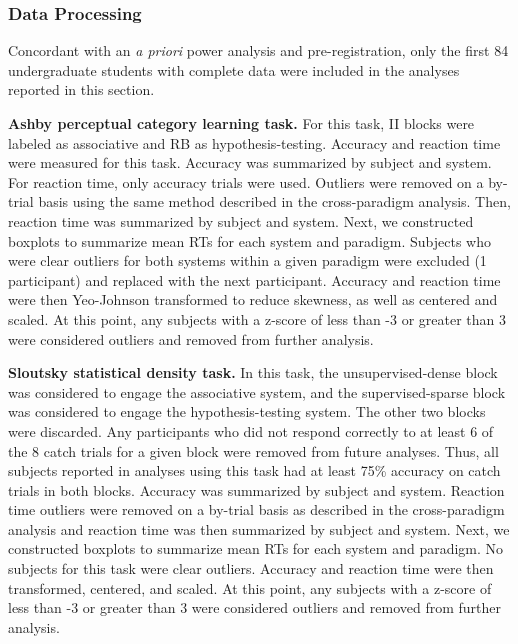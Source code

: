 \documentclass[../dissertation.tex]{subfiles}
\begin{document}
\subsubsection{Data Processing}

Concordant with an \textit{a priori} power analysis and pre-registration, only the first 84 undergraduate students with complete data were included in the analyses reported in this section.  \par
	\textbf{Ashby perceptual category learning task.} For this task, II blocks were labeled as associative and RB as hypothesis-testing. Accuracy and reaction time were measured for this task. Accuracy was summarized by subject and system. For reaction time, only accuracy trials were used. Outliers were removed on a by-trial basis using the same method described in the cross-paradigm analysis. Then, reaction time was summarized by subject and system. Next, we constructed boxplots to summarize mean RTs for each system and paradigm. Subjects who were clear outliers for both systems within a given paradigm were excluded (1 participant) and replaced with the next participant. Accuracy and reaction time were then Yeo-Johnson transformed to reduce skewness, as well as centered and scaled. At this point, any subjects with a z-score of less than -3 or greater than 3 were considered outliers and removed from further analysis. \par
	\textbf{Sloutsky statistical density task.} In this task, the unsupervised-dense block was considered to engage the associative system, and the supervised-sparse block was considered to engage the hypothesis-testing system. The other two blocks were discarded. Any participants who did not respond correctly to at least 6 of the 8 catch trials for a given block were removed from future analyses. Thus, all subjects reported in analyses using this task had at least 75\% accuracy on catch trials in both blocks. Accuracy was summarized by subject and system. Reaction time outliers were removed on a by-trial basis as described in the cross-paradigm analysis and reaction time was then summarized by subject and system. Next, we constructed boxplots to summarize mean RTs for each system and paradigm. No subjects for this task were clear outliers. Accuracy and reaction time were then transformed, centered, and scaled. At this point, any subjects with a z-score of less than -3 or greater than 3 were considered outliers and removed from further analysis. \par
\end{document}
